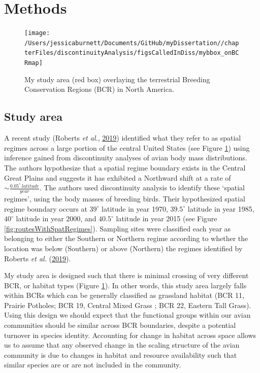 \documentclass[12pt,twoside,openany]{reedthesis}
\begin{document}
\hypertarget{methods-2}{%
\section{Methods}\label{methods-2}}
\begin{figure}
\texttt{[image: /Users/jessicaburnett/Documents/GitHub/myDissertation//chapterFiles/discontinuityAnalysis/figsCalledInDiss/mybbox\_onBCRmap]} \caption{My study area (red box) overlaying the terrestrial Breeding Conservation Regions (BCR) in North America.}\label{fig:studyarea}
\end{figure}
\hypertarget{study-area-1}{%
\subsection{Study area}\label{study-area-1}}

A recent study (Roberts \emph{et al.}, \protect\hyperlink{ref-roberts2019shifting}{2019}) identified what they refer to as spatial regimes across a large portion of the central United States (see Figure \ref{fig:studyarea}) using inference gained from discontinuity analyses of avian body mass distributions. The authors hypothesize that a spatial regime boundary exists in the Central Great Plains and suggests it has exhibited a Northward shift at a rate of \(\sim\frac{0.05^\circ\ latitude}{year}\). The authors used discontinuity analysis to identify these `spatial regimes', using the body masses of breeding birds. Their hypothesized spatial regime boundary occurs at \(39^\circ\) latitude in year 1970, \(39.5^\circ\) latitude in year 1985, \(40^\circ\) latitude in year 2000, and \(40.5^\circ\) latitude in year 2015 (see Figure \ref{fig:routesWithSpatRegimes}). Sampling sites were classified each year as belonging to either the Southern or Northern regime according to whether the location was below (Southern) or above (Northern) the regimes identified by Roberts \emph{et al.} (\protect\hyperlink{ref-roberts2019shifting}{2019}).

My study area is designed such that there is minimal crossing of very different BCR, or habitat types (Figure \ref{fig:studyarea}). In other words, this study area largely falls within BCRs which can be generally classified as grassland habitat (BCR 11, Prairie Potholes; BCR 19, Central Mixed Grass ; BCR 22, Eastern Tall Grass). Using this design we should expect that the functional groups within our avian communities should be similar across BCR boundaries, despite a potential turnover in species identity. Accounting for change in habitat across space allows us to assume that any observed change in the scaling structure of the avian community is due to changes in habitat and resource availability such that similar species are or are not included in the community.
\end{document}
